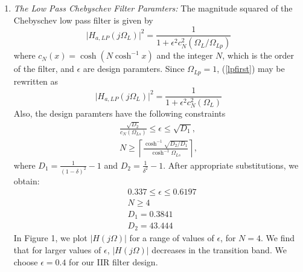 \documentclass[article]{IEEEtran}
\theoremstyle{remark}
\numberwithin{equation}{subsection}
\begin{document}
\begin{enumerate}
\item {\em The Low Pass Chebyschev Filter Paramters:}  The magnitude squared of the Chebyschev low pass filter is given by 
\begin{equation}
\label{lpfirst}
\vert H_{a,LP}(j\Omega_L)\vert^2 = \frac{1}{1 + \epsilon^2c_N^2(\Omega_L/\Omega_{Lp})}
\end{equation}
where $c_N(x) = \cosh(N \cosh^{-1}x)$ and the integer $N$, which is the order of the filter, and $\epsilon$ are design paramters.  Since $\Omega_{Lp} = 1$, (\ref{lpfirst}) may be rewritten as
\begin{equation}
\label{lpsecond}
\vert H_{a,LP}(j\Omega_L)\vert^2 = \frac{1}{1 + \epsilon^2c_N^2(\Omega_L)}
\end{equation}
Also, the design paramters have the following constraints
\begin{eqnarray}
\label{lpdesign}
\frac{\sqrt{D_2}}{c_N(\Omega_{Ls})} \leq \epsilon \leq \sqrt{D_1}, \nonumber \\
N \geq \left\lceil \frac{\cosh^{-1}\sqrt{D_2/D_1}}{\cosh^{-1}\Omega_{Ls}} \right\rceil,
\end{eqnarray}
where $D_1 = \frac{1}{(1 - \delta)^2}-1$ and $D_2 = \frac{1}{\delta^2} - 1$.  After appropriate substitutions,
we obtain:
\begin{align}
    &0.337 \leq \epsilon \leq 0.6197\\
    &N \geq 4 \\
    &D_1 = 0.3841\\
    &D_2 = 43.444
\end{align}
  In Figure 1, we plot $\vert H(j\Omega)\vert$ for a range of values of $\epsilon$, for $N = 4$. We find that for larger values of $\epsilon$, $|H(j\Omega)|$ decreases in the transition band.  We choose $\epsilon = 0.4$  for our IIR filter design.  



\end{enumerate}
\end{document}
